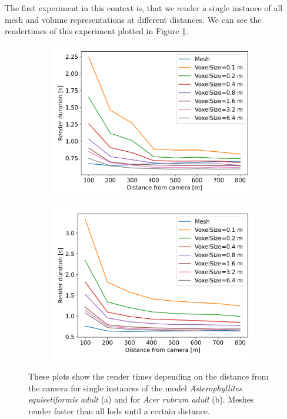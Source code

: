 The first experiment in this context is, that we render a single instance of all mesh and volume representations at different distances.
We can see the rendertimes of this experiment plotted in Figure \ref{fig:render_time_comparisons}.
\begin{figure}[ht]
    \centering
    \begin{subfigure}[b]{0.49\linewidth}
        \centering
        \includegraphics[width=1\linewidth]{img/results/render_durations_PR04a.png}
        \caption{}
    \end{subfigure}
    \begin{subfigure}[b]{0.49\linewidth}
        \centering
        \includegraphics[width=1\linewidth]{img/results/render_durations_EA01a.png}
        \caption{}
    \end{subfigure}
	\caption[Plots of the render times depending on the distance from the camera.]{These plots show the render times depending on the distance from the camera for single instances of the model \textit{Asterophyllites equisetiformis adult} (a) and for \textit{Acer rubrum adult} (b). Meshes render faster than all \acsp{lod} until a certain distance.}
	\label{fig:render_time_comparisons}
\end{figure}
